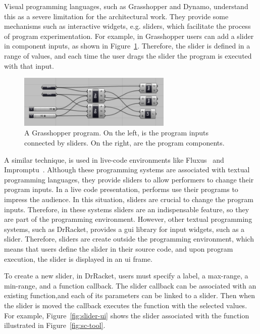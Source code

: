 Visual programming languages, such as Grasshopper and Dynamo, understand this as a severe limitation for the architectural work. They provide some mechanisms such as interactive widgets, e.g. sliders, which facilitate the process of program experimentation. For example, in Grasshopper users can add a slider in component inputs, as shown in Figure~\ref{fig:grass-con}. Therefore, the slider is defined in a range of values, and each time the user drags the slider the program is executed with that input.

\begin{figure}[h]
  \centering
  \includegraphics[width=0.65\textwidth]{images/grass-connections}
    \caption{A Grasshopper program. On the left, is the program inputs connected by sliders. On the right, are the program components.}
  \label{fig:grass-con}
\end{figure}

A similar technique, is used in live-code environments like Fluxus~\citep{griffiths2007fluxus} and Impromptu~\citep{sorensen2005impromptu}. Although these programming systems are associated with textual programming languages, they provide sliders to allow performers to change their program inputs. In a live code presentation, performs use their programs to impress the audience. In this situation,  sliders are crucial to change the program inputs. Therefore, in these systems sliders are an indispensable feature, so they are part of the programming environment. However, other textual programming systems, such as DrRacket, provides a \gls{gui} library for input widgets, such as a slider. Therefore, sliders are create outside the programming environment, which means that users define the slider in their source code, and upon program execution, the slider is displayed in an \gls{ui} frame. 

To create a new slider, in DrRacket, users must specify a label, a max-range, a min-range, and a function callback. The slider callback can be associated with an existing function,and each of its parameters can be linked to a slider. Then when the slider is moved the callback executes the function with the selected values. For example, Figure~\ref{fig:slider-ui} shows the slider associated with the function illustrated in Figure~\ref{fig:sc-tool}. 

